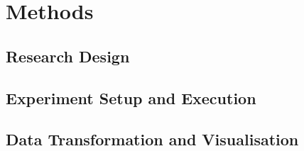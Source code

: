 \section{Methods}

\subsection{Research Design}


\subsection{Experiment Setup and Execution}


\subsection{Data Transformation and Visualisation}
